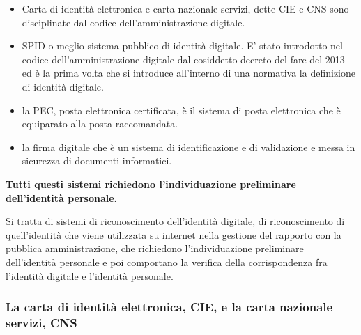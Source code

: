  \begin{itemize}
    \item Carta di identità elettronica e carta nazionale servizi, dette CIE e CNS sono disciplinate dal codice dell'amministrazione digitale.
 \item SPID o meglio sistema pubblico di identità digitale. E' stato introdotto nel codice dell'amministrazione digitale dal cosiddetto decreto del fare del 2013 ed è la prima volta che si introduce all'interno di una normativa la definizione di identità digitale. 
 \item la PEC, posta elettronica certificata, è il sistema di posta elettronica che è equiparato alla posta raccomandata. 
 \item la firma digitale che è un sistema di identificazione e di validazione e messa in sicurezza di documenti informatici. 
 \end{itemize}
 \textbf{Tutti questi sistemi richiedono l'individuazione preliminare dell'identità personale.}\par
 Si tratta di sistemi di riconoscimento dell'identità digitale, di riconoscimento di quell'identità che viene utilizzata su internet nella gestione del rapporto con la pubblica amministrazione, che richiedono l'individuazione preliminare dell'identità personale e poi comportano la verifica della corrispondenza fra l'identità digitale e l'identità personale. 

\subsubsection{La carta di identità elettronica, CIE, e la carta nazionale servizi, CNS}
 
